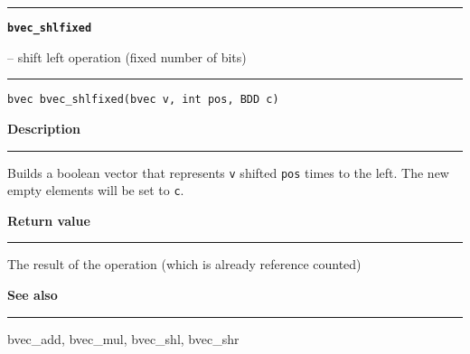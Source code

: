\begin{minipage}{\textwidth}

\noindent\begin{minipage}{\textwidth}
\rule{\textwidth}{0.5mm}
{\tt\bf bvec\_shlfixed }
\--- shift left operation (fixed number of bits)  \hspace{\fill}
\\\rule[1.5ex]{\textwidth}{0.5mm}
\end{minipage}

\noindent\begin{verbatim}
bvec bvec_shlfixed(bvec v, int pos, BDD c) 
\end{verbatim}

\vspace{\parsep}\noindent
{\bf Description}\\\rule[1.5ex]{\textwidth}{0.2mm}\vspace{-1.5ex}\setlength{\parindent}{1em}
Builds a boolean vector that represents {\tt v} shifted {\tt pos}
           times to the left. The new empty elements will be set to {\tt c}.

\setlength{\parindent}{0em}\vspace{\parsep}\vspace{\baselineskip}\noindent
{\bf Return value}\\\rule[1.5ex]{\textwidth}{0.2mm}\vspace{-1.5ex}
The result of the operation (which is already reference counted) 

\vspace{\parsep}\vspace{\baselineskip}\noindent
{\bf See also}\\\rule[1.5ex]{\textwidth}{0.2mm}\vspace{-1.5ex}
bvec\_add, bvec\_mul, bvec\_shl, bvec\_shr 
\end{minipage}
\vspace{8ex}
